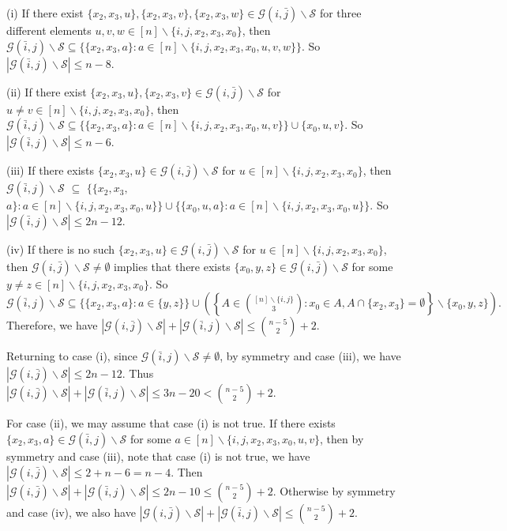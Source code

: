 \documentclass[11pt]{article}
\numberwithin{equation}{section}
\begin{document}
(i) If there exist $\{x_2, x_3, u\}, \{x_2, x_3, v\}, \{x_2, x_3, w\}
\in \mathcal{G}(i,\bar{j})\backslash\mathcal{S}$ for three different elements $u, v, w\in [n]\backslash\{i, j, x_2,x_3,x_0\}$, then
$
\mathcal{G}(\bar{i},j) \backslash\mathcal{S}\subseteq\{\{x_2, x_3, a\}:a\in [n]\backslash\{i, j, x_2,x_3,x_0, u, v, w\}\}.
$
So $|\mathcal{G}(\bar{i},j)\backslash\mathcal{S}|\leq n-8$.


(ii) If there exist $\{x_2, x_3, u\}, \{x_2, x_3, v\}
\in \mathcal{G}(i,\bar{j})\backslash\mathcal{S}$ for $u\neq v\in [n]\backslash\{i, j, x_2,x_3,x_0\}$, then
$
\mathcal{G}(\bar{i},j) \backslash\mathcal{S}\subseteq\{\{x_2, x_3, a\}:a\in [n]\backslash\{i, j, x_2,x_3,x_0, u, v\}\}\cup \{x_0, u, v\}.
$
So $|\mathcal{G}(\bar{i},j)\backslash\mathcal{S}|\leq n-6$.


(iii) If there exists $\{x_2, x_3, u\}\in \mathcal{G}(i,\bar{j})\backslash\mathcal{S}$ for $u\in [n]\backslash\{i, j, x_2,x_3,x_0\}$, then
$
\mathcal{G}(\bar{i},j) \backslash\mathcal{S}$ $\subseteq$ $\{\{x_2, x_3, $ $a\} : a\in [n]\backslash\{i, j, x_2,x_3,x_0, u\}\}\cup\{ \{x_0, u, a\}: a\in [n]\backslash\{i, j, x_2,x_3,x_0, u\}\}.
$
So $|\mathcal{G}(\bar{i},j)\backslash\mathcal{S}|\leq 2n-12$.

(iv) If there is no such $\{x_2, x_3, u\}\in \mathcal{G}(i,\bar{j})\backslash\mathcal{S}$ for $u\in [n]\backslash\{i, j, x_2,x_3,x_0\}$, then $\mathcal{G}(i,\bar{j}) \backslash\mathcal{S}\neq \emptyset$ implies that there exists $\{x_0, y, z\}\in \mathcal{G}(i,\bar{j}) \backslash\mathcal{S}$ for some $y\neq z \in  [n]\backslash\{i, j, x_2,x_3,x_0\}$. So
$
\mathcal{G}(\bar{i},j) \backslash\mathcal{S}\subseteq\{\{x_2, x_3, a\}:a\in \{y,z\}\}\cup\left(\left\{A \in\binom{[n]\backslash \{i,j\}}{3}: x_0\in A, A\cap\{x_2,x_3\} = \emptyset\right\}\backslash \{x_0, y, z\}\right).
$
Therefore, we have $|\mathcal{G}(i,\bar{j})\backslash\mathcal{S}|+|\mathcal{G}(\bar{i},j)\backslash\mathcal{S}|\leq \binom{n-5}{2}+2$.



Returning to case (i), since $\mathcal{G}(\bar{i},j) \backslash\mathcal{S}
\neq \emptyset$, by symmetry and case (iii), we have  $|\mathcal{G}(i,\bar{j})\backslash\mathcal{S}|\leq 2n-12$. Thus $|\mathcal{G}(i,\bar{j})\backslash\mathcal{S}|+|\mathcal{G}(\bar{i},j)\backslash\mathcal{S}|\leq 3n-20<\binom{n-5}{2}+2$.


 For case (ii), we may assume that case (i) is not true.
If there exists $\{x_2, x_3, a\}\in \mathcal{G}(\bar{i},j)\backslash\mathcal{S}$ for some $a\in [n]\backslash\{i, j, x_2,x_3,x_0, u, v\}$, then by symmetry and case (iii), note that case (i) is not true, we have $|\mathcal{G}(i,\bar{j})\backslash\mathcal{S}|\leq 2+n-6=n-4$. Then $|\mathcal{G}(i,\bar{j})\backslash\mathcal{S}|+|\mathcal{G}(\bar{i},j)\backslash\mathcal{S}|\leq 2n-10\leq \binom{n-5}{2}+2$. Otherwise by symmetry and case (iv), we also have $|\mathcal{G}(i,\bar{j})\backslash\mathcal{S}|+|\mathcal{G}(\bar{i},j)\backslash\mathcal{S}|\leq \binom{n-5}{2}+2$.
\end{document}
